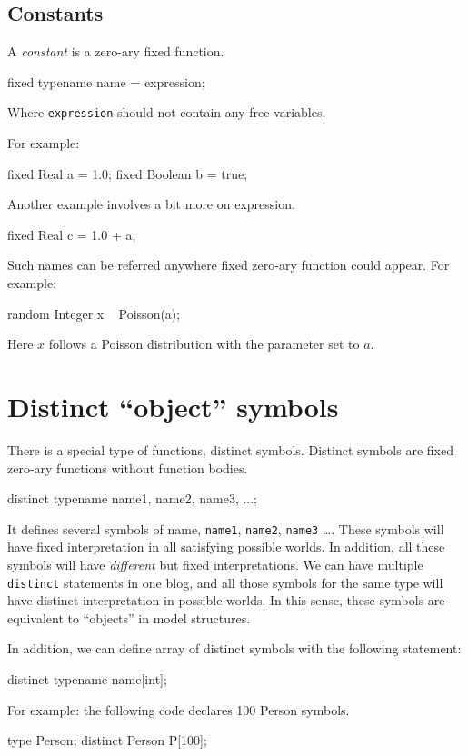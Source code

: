 \documentclass[12pt]{article}
\begin{document}
\subsection{Constants}
A {\em constant} is a zero-ary fixed function.
\begin{blogcode}
fixed typename name = expression;
\end{blogcode} 
Where \texttt{expression} should not contain any free variables. 

For example:
\begin{blogcode}
fixed Real a = 1.0;
fixed Boolean b = true;
\end{blogcode}

Another example involves a bit more on expression.
\begin{blogcode}
fixed Real c = 1.0 + a;
\end{blogcode}

Such names can be referred anywhere fixed zero-ary function could appear.
For example:
\begin{blogcode}
random Integer x ~ Poisson(a);
\end{blogcode}
Here $x$ follows a Poisson distribution with the parameter set to $a$.

\section{Distinct ``object'' symbols}
There is a special type of functions, distinct symbols. 
Distinct symbols are fixed zero-ary functions without function bodies.
\begin{blogcode}
distinct typename name1, name2, name3, ...;
\end{blogcode}
It defines several symbols of name, \texttt{name1}, \texttt{name2}, \texttt{name3} \dots.
These symbols will have fixed interpretation in all satisfying possible worlds. In addition, all these symbols will have \emph{different} but fixed interpretations. 
We can have multiple \texttt{distinct} statements in one blog, and all those symbols for the same type will have 
distinct interpretation in possible worlds. In this sense, these symbols are equivalent to ``objects'' in model structures. 

In addition, we can define array of distinct symbols with the following statement:
\begin{blogcode}
distinct typename name[int];
\end{blogcode}
For example: the following \bl code declares 100 Person symbols.  
\begin{blogcode}
type Person;
distinct Person P[100];
\end{blogcode}
\end{document}

